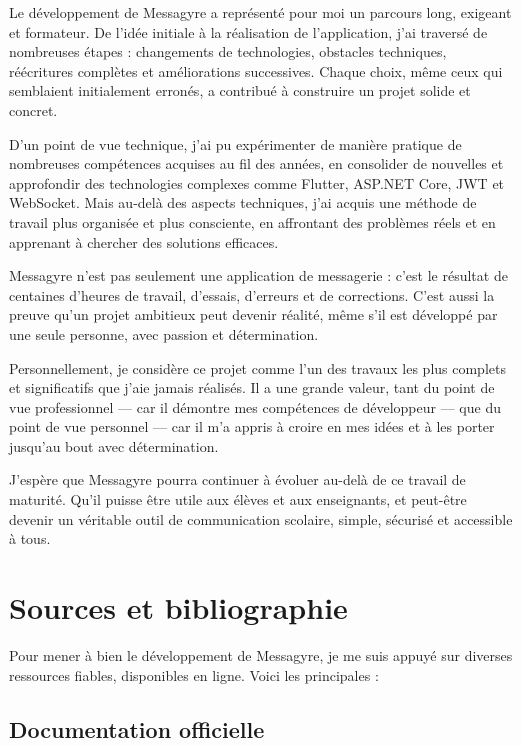 \documentclass[12pt]{report}
\begin{document}
Le développement de Messagyre a représenté pour moi un parcours long, exigeant et formateur. De l’idée initiale à la réalisation de l’application, j’ai traversé de nombreuses étapes : changements de technologies, obstacles techniques, réécritures complètes et améliorations successives. Chaque choix, même ceux qui semblaient initialement erronés, a contribué à construire un projet solide et concret.

D’un point de vue technique, j’ai pu expérimenter de manière pratique de nombreuses compétences acquises au fil des années, en consolider de nouvelles et approfondir des technologies complexes comme Flutter, ASP.NET Core, JWT et WebSocket. Mais au-delà des aspects techniques, j’ai acquis une méthode de travail plus organisée et plus consciente, en affrontant des problèmes réels et en apprenant à chercher des solutions efficaces.

Messagyre n’est pas seulement une application de messagerie : c’est le résultat de centaines d’heures de travail, d’essais, d’erreurs et de corrections. C’est aussi la preuve qu’un projet ambitieux peut devenir réalité, même s’il est développé par une seule personne, avec passion et détermination.

Personnellement, je considère ce projet comme l’un des travaux les plus complets et significatifs que j’aie jamais réalisés. Il a une grande valeur, tant du point de vue professionnel — car il démontre mes compétences de développeur — que du point de vue personnel — car il m’a appris à croire en mes idées et à les porter jusqu’au bout avec détermination.

J’espère que Messagyre pourra continuer à évoluer au-delà de ce travail de maturité. Qu’il puisse être utile aux élèves et aux enseignants, et peut-être devenir un véritable outil de communication scolaire, simple, sécurisé et accessible à tous.


\chapter{Sources et bibliographie}

Pour mener à bien le développement de Messagyre, je me suis appuyé sur diverses ressources fiables, disponibles en ligne. Voici les principales :

\section{Documentation officielle}
\end{document}
